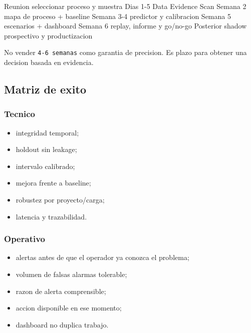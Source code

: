 \documentclass[
  spanish,
  10pt,
  a4paper,
]{article}
\newenvironment{Shaded}{}{}
\newcommand{\NormalTok}[1]{#1}
\providecommand{\tightlist}{%
  \setlength{\itemsep}{0pt}\setlength{\parskip}{0pt}}
\begin{document}
\begin{Shaded}
\begin{Highlighting}[]
\NormalTok{Reunion        seleccionar proceso y muestra}
\NormalTok{Dias 1{-}5       Data Evidence Scan}
\NormalTok{Semana 2       mapa de proceso + baseline}
\NormalTok{Semana 3{-}4     predictor y calibracion}
\NormalTok{Semana 5       escenarios + dashboard}
\NormalTok{Semana 6       replay, informe y go/no{-}go}
\NormalTok{Posterior      shadow prospectivo y productizacion}
\end{Highlighting}
\end{Shaded}

No vender \texttt{4-6\ semanas} como garantia de precision. Es plazo
para obtener una decision basada en evidencia.

\subsection{Matriz de exito}\label{matriz-de-exito}

\subsubsection{Tecnico}\label{tecnico}

\begin{itemize}
\tightlist
\item
  integridad temporal;
\item
  holdout sin leakage;
\item
  intervalo calibrado;
\item
  mejora frente a baseline;
\item
  robustez por proyecto/carga;
\item
  latencia y trazabilidad.
\end{itemize}

\subsubsection{Operativo}\label{operativo}

\begin{itemize}
\tightlist
\item
  alertas antes de que el operador ya conozca el problema;
\item
  volumen de falsas alarmas tolerable;
\item
  razon de alerta comprensible;
\item
  accion disponible en ese momento;
\item
  dashboard no duplica trabajo.
\end{itemize}
\end{document}
